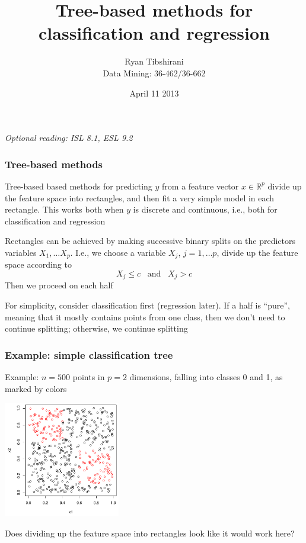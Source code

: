 \documentclass[mathserif]{beamer}
\def\R{\mathds{R}}
\def\red{\color[rgb]{0.8,0,0}}
\begin{document}
\title{Tree-based methods for classification and regression}
\author{Ryan Tibshirani \\ Data Mining: 36-462/36-662}
\date{April 11 2013}

\begin{frame}
\maketitle
{\it Optional reading: ISL 8.1, ESL 9.2}
\end{frame} 

\begin{frame}
\frametitle{Tree-based methods}
{\red Tree-based based} methods for predicting $y$ from a feature
vector $x \in \R^p$ divide up the feature space into rectangles,
and then fit a very simple model in each rectangle. This works
both when $y$ is discrete and continuous, i.e., both for 
{\red classification} and {\red regression}

\bigskip
Rectangles can be achieved by making successive 
binary splits on the predictors variables $X_1,\ldots X_p$. I.e.,
we choose a variable $X_j$, $j=1,\ldots p$, {\red divide} up the 
feature space according to 
$$X_j \leq c \;\;\;\text{and}\;\;\; X_j > c$$ Then we proceed
on each half

\bigskip For simplicity, consider classification first
(regression later). If a half is ``pure'', meaning that it
mostly contains points from one class, then we
don't need to continue splitting; otherwise, we continue splitting
\end{frame}

\begin{frame}
\frametitle{Example: simple classification tree}
Example: $n=500$ points in $p=2$ dimensions, falling into classes 
0 and 1, as marked by colors

\smallskip
\begin{center}
\includegraphics[width=2in]{simpledata.pdf}
\end{center}

\vspace{-4pt}
Does dividing up the feature space into rectangles look like it
would work here?
\end{frame}
\end{document}
